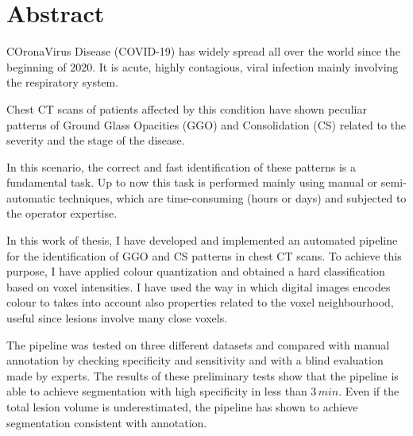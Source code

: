 \documentclass{standalone}
\begin{document}
	\chapter*{Abstract}
	
	COronaVirus Disease (COVID-19) has widely spread all over the world since the beginning of 2020. It is acute, highly contagious, viral infection mainly involving the respiratory system.

	Chest CT scans of patients affected by this condition have shown peculiar patterns of Ground Glass Opacities (GGO) and Consolidation (CS) related to the severity and the stage of the disease.

	In this scenario, the correct and fast identification of these patterns is a fundamental task. Up to now this task is performed mainly using manual or semi-automatic techniques, which are time-consuming (hours or days) and subjected to the operator expertise.

	In this work of thesis, I have developed and implemented an automated pipeline for the identification of GGO and CS patterns in chest CT scans. To achieve this purpose, I have applied colour quantization and obtained a hard classification based on voxel intensities. I have used the way in which digital images encodes colour to takes into account also properties related to the voxel neighbourhood, useful since lesions involve many close voxels.
	
	The pipeline was tested on three different datasets and compared with manual annotation by checking specificity and sensitivity and with a blind evaluation made by experts. The results of these preliminary tests show that the pipeline is able to achieve segmentation with high specificity in less than $3\,min$. Even if the total lesion volume is underestimated, the pipeline has shown to achieve segmentation consistent with annotation. 


	
\end{document}
